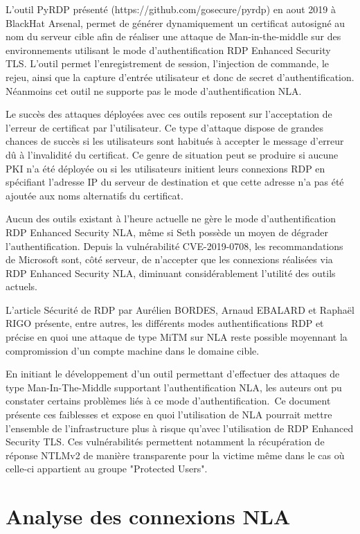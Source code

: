 L'outil PyRDP présenté (https://github.com/gosecure/pyrdp) en aout 2019 à BlackHat Arsenal, permet de générer dynamiquement un certificat autosigné au nom du serveur cible afin de réaliser une attaque de Man-in-the-middle sur des environnements utilisant le mode d'authentification RDP Enhanced Security TLS. L'outil permet l'enregistrement de session, l'injection de commande, le rejeu, ainsi que la capture d'entrée utilisateur et donc de secret d'authentification. Néanmoins cet outil ne supporte pas le mode d'authentification NLA.

Le succès des attaques déployées avec ces outils reposent sur l'acceptation de l'erreur de certificat par l'utilisateur. Ce type d'attaque dispose de grandes chances de succès si les utilisateurs sont habitués à accepter le message d'erreur dû à l'invalidité du certificat. Ce genre de situation peut se produire si aucune PKI n'a été déployée ou si les utilisateurs initient leurs connexions RDP en spécifiant l'adresse IP du serveur de destination et que cette adresse n'a pas été ajoutée aux noms alternatifs du certificat.

Aucun des outils existant à l’heure actuelle ne gère le mode d’authentification RDP Enhanced Security NLA, même si Seth possède un moyen de dégrader l’authentification. Depuis la vulnérabilité CVE-2019-0708, les recommandations de Microsoft sont, côté serveur, de n’accepter que les connexions réalisées via RDP Enhanced Security NLA, diminuant considérablement l'utilité des outils actuels.

L'article Sécurité de RDP par Aurélien BORDES, Arnaud EBALARD et Raphaël RIGO présente, entre autres, les différents modes authentifications RDP et précise en quoi une attaque de type MiTM sur NLA reste possible moyennant la compromission d'un compte machine dans le domaine cible. 

En initiant le développement d’un outil permettant d’effectuer des attaques de type Man-In-The-Middle supportant l’authentification NLA, les auteurs ont pu constater certains problèmes liés à ce mode d’authentification. Ce document présente ces faiblesses et expose en quoi l’utilisation de NLA pourrait mettre l’ensemble de l’infrastructure plus à risque qu’avec l’utilisation de RDP Enhanced Security TLS.
Ces vulnérabilités permettent notamment la récupération de réponse NTLMv2 de manière transparente pour la victime même dans le cas où celle-ci appartient au groupe "Protected Users".

\section{Analyse des connexions NLA}
